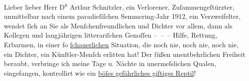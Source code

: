 \toendnotes[C]{\smallbreak}
\pstart{}{\pb}Lieber lieber Herr \textsc{D\textsuperscript{r}} Arthur Schnitzler,\pend\vspace{0.5em}
\pstart
           ein Verlorener, Zuſammengeſtürzter, unmittelbar nach einem paradieſiſchen Semmering-Jahr 1912, ein  Verzweifelter, wendet{ }ſich an Sie als
               Menſchenfreundlichen und Dichter vor allem, dann als Kollegen und langjährigen
               litterariſchen Genoſſen – – – Hilfe, Rettung, Erbarmen, in einer{ }ſo \uline{ſchauerlichen} Situation, die noch nie, noch nie, noch nie,
               ein Dichter, ein Künſtler-Menſch erlitten hat! {\pb}Der{ }ſüßen unentbehrlichen Freiheit
               beraubt, verbringe ich meine Tage u. Nächte in unermeſslichen Qualen, eingefangen,
               kontrollirt wie ein \uline{böſes gefährliches giftiges
                  Reptil}!\pend
           

